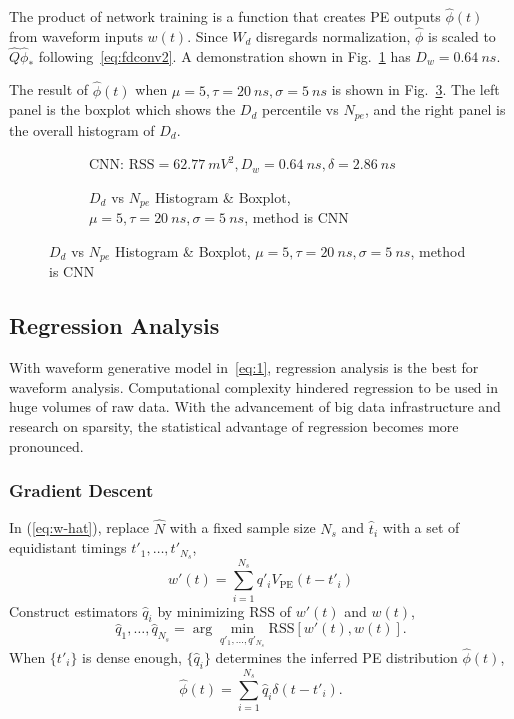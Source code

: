 The product of network training is a function that creates PE outputs $\hat{\phi}(t)$ from waveform inputs $w(t)$.  Since $W_d$ disregards normalization, $\hat{\phi}$ is scaled to $\hat{Q}\hat{\phi}_*$ following~\eqref{eq:fdconv2}. A demonstration shown in Fig.~\ref{fig:cnn} has $D_w = \SI{0.64}{ns}$. 

The result of $\hat{\phi}(t)$ when $\mu=5, \tau=\SI{20}{ns}, \sigma=\SI{5}{ns}$ is shown in Fig.~\ref{fig:cnn-npe}. The left panel is the boxplot which shows the $D_d$ percentile vs $N_{pe}$, and the right panel is the overall histogram of $D_d$. 

\begin{figure}[H]
  \begin{subfigure}{.5\textwidth}
    \centering
    \resizebox{\textwidth}{!}{}
    \caption{\label{fig:cnn}CNN: $\mathrm{RSS}=\SI{62.77}{mV^2},D_w=\SI{0.64}{ns},\delta=\SI{2.86}{ns}$}
  \end{subfigure}
  \begin{subfigure}{.5\textwidth}
    \centering
    \resizebox{\textwidth}{!}{}
    \caption{\label{fig:cnn-npe} $D_d$ vs $N_{pe}$ Histogram \& Boxplot, $\mu=5, \tau=\SI{20}{ns}, \sigma=\SI{5}{ns}$, method is CNN}
  \end{subfigure}
\end{figure}

\subsection{Regression Analysis}
With waveform generative model in~\eqref{eq:1}, regression analysis is the best for waveform analysis.  Computational complexity hindered regression to be used in huge volumes of raw data.  With the advancement of big data infrastructure and research on sparsity, the statistical advantage of regression becomes more pronounced.

\subsubsection{Gradient Descent}
In (\ref{eq:w-hat}), replace $\hat{N}$ with a fixed sample size $N_s$ and $\hat{t}_i$ with a set of equidistant timings $t'_1, \ldots, t'_{N_s}$,
\begin{equation}
  \label{eq:gd}
  w'(t) = \sum_{i=1}^{N_s}q'_iV_\mathrm{PE}(t-t'_i)
\end{equation}
Construct estimators $\hat{q}_i$ by minimizing RSS of $w'(t)$ and $w(t)$,
\begin{equation}
  \label{eq:gd-q}
  \hat{q}_1, \ldots, \hat{q}_{N_s} = \arg \underset{q'_1, \ldots, q'_{N_s}}{\min} \mathrm{RSS}\left[w'(t),w(t)\right].
\end{equation}
When $\{t'_i\}$ is dense enough, $\{\hat{q}_i\}$ determines the inferred PE distribution $\hat{\phi}(t)$,
\begin{equation}
  \label{eq:gd-phi}
  \hat{\phi}(t) = \sum_{i=1}^{N_s}\hat{q}_i\delta(t-t'_i).
\end{equation}

